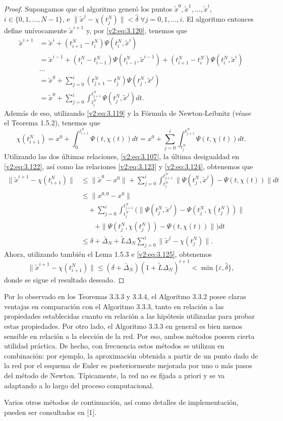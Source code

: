 \begin{proof}
    Supongamos que el algoritmo generó los puntos $\tilde{x}^0, \tilde{x}^1, \dots, \tilde{x}^i$, $i \in \{0, 1, \dots, N-1\}$, e $\|\tilde{x}^j - \chi(t_j^N)\| < \hat{\delta} \; \forall j = 0, 1, \dots, i$. El algoritmo entonces define unívocamente $\tilde{x}^{i+1}$ y, por \eqref{v2:eq:3.120}, tenemos que
    \begin{align*}
        \tilde{x}^{i+1} &= \tilde{x}^i + (t_{i+1}^N - t_i^N)\Psi(t_i^N, \tilde{x}^i) \\
        &= \tilde{x}^{i-1} + (t_i^N - t_{i-1}^N)\Psi(t_{i-1}^N, \tilde{x}^{i-1}) + (t_{i+1}^N - t_i^N)\Psi(t_i^N, \tilde{x}^i) \\
        &\dots \\
        &= \tilde{x}^0 + \sum_{j=0}^i (t_{j+1}^N - t_j^N)\Psi(t_j^N, \tilde{x}^j) \\
        &= \tilde{x}^0 + \sum_{j=0}^i \int_{t_j^N}^{t_{j+1}^N} \Psi(t_j^N, \tilde{x}^j) dt.
    \end{align*}
    Además de eso, utilizando \eqref{v2:eq:3.119} y la Fórmula de Newton-Leibnitz (véase el Teorema 1.5.2), tenemos que
    \[
        \chi(t_{i+1}^N) = x^0 + \int_0^{t_{i+1}^N} \Psi(t, \chi(t)) dt = x^0 + \sum_{j=0}^i \int_{t_j^N}^{t_{j+1}^N} \Psi(t, \chi(t)) dt.
    \]
    Utilizando las dos últimas relaciones, \eqref{v2:eq:3.107}, la última desigualdad en \eqref{v2:eq:3.122}, así como las relaciones \eqref{v2:eq:3.123} y \eqref{v2:eq:3.124}, obtenemos que
    \begin{align*}
        \|\tilde{x}^{i+1} - \chi(t_{i+1}^N)\| &\le \|\tilde{x}^0 - x^0\| + \sum_{j=0}^i \int_{t_j^N}^{t_{j+1}^N} \|\Psi(t_j^N, \tilde{x}^j) - \Psi(t, \chi(t))\| dt \\
        &\le \|x^{0,0} - x^0\| \\
        &\quad + \sum_{j=0}^i \int_{t_j^N}^{t_{j+1}^N} (\|\Psi(t_j^N, \tilde{x}^j) - \Psi(t_j^N, \chi(t_j^N))\| \\
        &\quad\quad + \|\Psi(t_j^N, \chi(t_j^N)) - \Psi(t, \chi(t))\|) dt \\
        &\le \delta + \bar{\Delta}_N + \tilde{L}\Delta_N \sum_{j=0}^i \|\tilde{x}^j - \chi(t_j^N)\|.
    \end{align*}
    Ahora, utilizando también el Lema 1.5.3 e \eqref{v2:eq:3.125}, obtenemos
    \[
        \|\tilde{x}^{i+1} - \chi(t_{i+1}^N)\| \le (\delta + \bar{\Delta}_N)(1 + \tilde{L}\Delta_N)^{i+1} < \min\{\varepsilon, \hat{\delta}\},
    \]
    donde se sigue el resultado deseado.
\end{proof}

Por lo observado en los Teoremas 3.3.3 y 3.3.4, el Algoritmo 3.3.2 posee claras ventajas en comparación con el Algoritmo 3.3.3, tanto en relación a las propiedades establecidas cuanto en relación a las hipótesis utilizadas para probar estas propiedades. Por otro lado, el Algoritmo 3.3.3 en general es bien menos sensible en relación a la elección de la red. Por eso, ambos métodos poseen cierta utilidad práctica. De hecho, con frecuencia estos métodos se utilizan en combinación: por ejemplo, la aproximación obtenida a partir de un punto dado de la red por el esquema de Euler es posteriormente mejorada por uno o más pasos del método de Newton. Típicamente, la red no es fijada a priori y se va adaptando a lo largo del proceso computacional.

Varios otros métodos de continuación, así como detalles de implementación, pueden ser consultados en [1].
